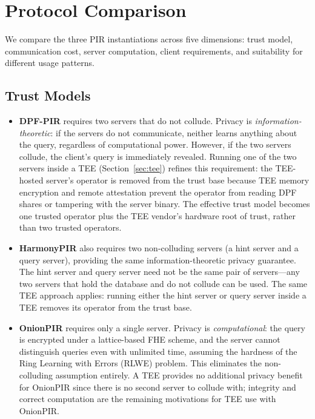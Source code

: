 \section{Protocol Comparison}
\label{sec:comparison}

We compare the three PIR instantiations across five dimensions: trust model, communication cost, server computation, client requirements, and suitability for different usage patterns.

\subsection{Trust Models}

\begin{itemize}[nolistsep,leftmargin=*]
    \item \textbf{DPF-PIR} requires two servers that do not collude. Privacy is \emph{information-theoretic}: if the servers do not communicate, neither learns anything about the query, regardless of computational power. However, if the two servers collude, the client's query is immediately revealed. Running one of the two servers inside a TEE (Section~\ref{sec:tee}) refines this requirement: the TEE-hosted server's operator is removed from the trust base because TEE memory encryption and remote attestation prevent the operator from reading DPF shares or tampering with the server binary. The effective trust model becomes one trusted operator plus the TEE vendor's hardware root of trust, rather than two trusted operators.

    \item \textbf{HarmonyPIR} also requires two non-colluding servers (a hint server and a query server), providing the same information-theoretic privacy guarantee. The hint server and query server need not be the same pair of servers---any two servers that hold the database and do not collude can be used. The same TEE approach applies: running either the hint server or query server inside a TEE removes its operator from the trust base.

    \item \textbf{OnionPIR} requires only a single server. Privacy is \emph{computational}: the query is encrypted under a lattice-based FHE scheme, and the server cannot distinguish queries even with unlimited time, assuming the hardness of the Ring Learning with Errors (RLWE) problem. This eliminates the non-colluding assumption entirely. A TEE provides no additional privacy benefit for OnionPIR since there is no second server to collude with; integrity and correct computation are the remaining motivations for TEE use with OnionPIR.
\end{itemize}

